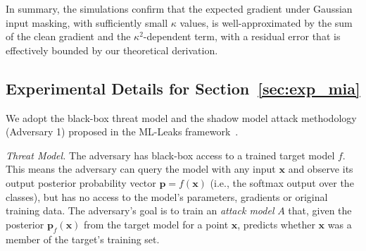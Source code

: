 \documentclass[10pt]{article} %
\theoremstyle{definition}
\theoremstyle{plain}
\begin{document}
In summary, the simulations confirm that the expected gradient under Gaussian input masking, with sufficiently small $\kappa$ values, is well-approximated by the sum of the clean gradient and the $\kappa^2$-dependent term, with a residual error that is effectively bounded by our theoretical derivation.

\subsection{Experimental Details for Section~\ref{sec:exp_mia}}
\label{sec:mia_details}
We adopt the black-box threat model and the shadow model attack methodology (Adversary 1) proposed in the ML-Leaks framework~\citep{salem2019mlleaks}.

\noindent\textit{Threat Model.} The adversary has black-box access to a trained target model $f$. This means the adversary can query the model with any input $\mathbf{x}$ and observe its output posterior probability vector $\mathbf{p} = f(\mathbf{x})$ (i.e., the softmax output over the classes), but has no access to the model's parameters, gradients or original training data. The adversary's goal is to train an \textit{attack model} $A$ that, given the posterior $\mathbf{p}_f(\mathbf{x})$ from the target model for a point $\mathbf{x}$, predicts whether $\mathbf{x}$ was a member of the target's training set.
\end{document}
